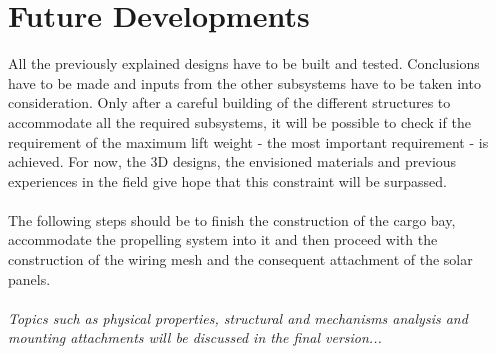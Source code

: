 \section{Future Developments}

All the previously explained designs have to be built and tested. Conclusions have to be made and inputs from the other subsystems have to be taken into consideration. Only after a careful building of the different structures to accommodate all the required subsystems, it will be possible to check if the requirement of the maximum lift weight - the most important requirement - is achieved. For now, the 3D designs, the envisioned materials and previous experiences in the field give hope that this constraint will be surpassed.
\\
\\
The following steps should be to finish the construction of the cargo bay, accommodate the propelling system into it and then proceed with the construction of the wiring mesh and the consequent attachment of the solar panels.
\\
\\
\textit{Topics such as physical properties, structural and mechanisms analysis and mounting attachments will be discussed in the final version...}
%
%
%
%
%
%
%
%
%
%
%
